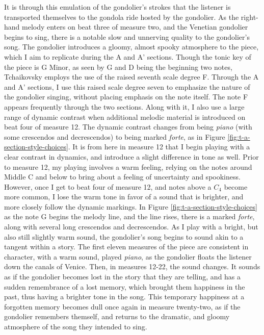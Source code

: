 It is through this emulation of the gondolier's strokes that the listener is transported themselves to the gondola ride hosted by the gondolier. As the right-hand melody enters on beat three of measure two, and the Venetian gondolier begins to sing, there is a notable slow and unnerving quality to the gondolier's song. The gondolier introduces a gloomy, almost spooky atmosphere to the piece, which I aim to replicate during the A and A' sections. Though the tonic key of the piece is G Minor, as seen by G and D being the beginning two notes, Tchaikovsky employs the use of the raised seventh scale degree F\musSharp{}. Through the A and A' sections, I use this raised scale degree seven to emphasize the nature of the gondolier singing, without placing emphasis on the note itself. The note F\musSharp{} appears frequently through the two sections. Along with it, I also use a large range of dynamic contrast when additional melodic material is introduced on beat four of measure 12. The dynamic contrast changes from being \textit{piano} (with some crescendos and decrescendos) to being marked \textit{forte}, as in Figure \ref{fig:t-a-section-style-choices}\autocite{Henle_2002}. It is from here in measure 12 that I begin playing with a clear contrast in dynamics, and introduce a slight difference in tone as well. Prior to measure 12, my playing involves a warm feeling, relying on the notes around Middle C and below to bring about a feeling of uncertainty and spookiness. However, once I get to beat four of measure 12, and notes above a $C_4$ become more common, I lose the warm tone in favor of a sound that is brighter, and more closely follow the dynamic markings. In Figure \ref{fig:t-a-section-style-choices}\autocite{Henle_2002} as the note G begins the melody line, and the line rises, there is a marked \textit{forte}, along with several long crescendos and decrescendos. As I play with a bright, but also still slightly warm sound, the gondolier's song begins to sound akin to a tangent within a story. The first eleven measures of the piece are consistent in character, with a warm sound, played \textit{piano}, as the gondolier floats the listener down the canals of Venice. Then, in measures 12-22, the sound changes. It sounds as if the gondolier becomes lost in the story that they are telling, and has a sudden remembrance of a lost memory, which brought them happiness in the past, thus having a brighter tone in the song. This temporary happiness at a forgotten memory becomes dull once again in measure twenty-two, as if the gondolier remembers themself, and returns to the dramatic, and gloomy atmosphere of the song they intended to sing.


